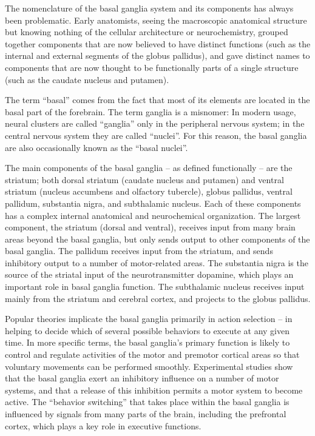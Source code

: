 The nomenclature of the basal ganglia system and its components has always been problematic. Early anatomists, seeing the macroscopic anatomical structure but knowing nothing of the cellular architecture or neurochemistry, grouped together components that are now believed to have distinct functions (such as the internal and external segments of the globus pallidus), and gave distinct names to components that are now thought to be functionally parts of a single structure (such as the caudate nucleus and putamen).

The term ``basal'' comes from the fact that most of its elements are located in the basal part of the forebrain. The term ganglia is a misnomer: In modern usage, neural clusters are called ``ganglia'' only in the peripheral nervous system; in the central nervous system they are called ``nuclei''. For this reason, the basal ganglia are also occasionally known as the ``basal nuclei''.

The main components of the basal ganglia -- as defined functionally -- are the striatum; both dorsal striatum (caudate nucleus and putamen) and ventral striatum (nucleus accumbens and olfactory tubercle), globus pallidus, ventral pallidum, substantia nigra, and subthalamic nucleus. Each of these components has a complex internal anatomical and neurochemical organization. The largest component, the striatum (dorsal and ventral), receives input from many brain areas beyond the basal ganglia, but only sends output to other components of the basal ganglia. The pallidum receives input from the striatum, and sends inhibitory output to a number of motor-related areas. The substantia nigra is the source of the striatal input of the neurotransmitter dopamine, which plays an important role in basal ganglia function. The subthalamic nucleus receives input mainly from the striatum and cerebral cortex, and projects to the globus pallidus.

Popular theories implicate the basal ganglia primarily in action selection -- in helping to decide which of several possible behaviors to execute at any given time. In more specific terms, the basal ganglia's primary function is likely to control and regulate activities of the motor and premotor cortical areas so that voluntary movements can be performed smoothly. Experimental studies show that the basal ganglia exert an inhibitory influence on a number of motor systems, and that a release of this inhibition permits a motor system to become active. The ``behavior switching'' that takes place within the basal ganglia is influenced by signals from many parts of the brain, including the prefrontal cortex, which plays a key role in executive functions.

